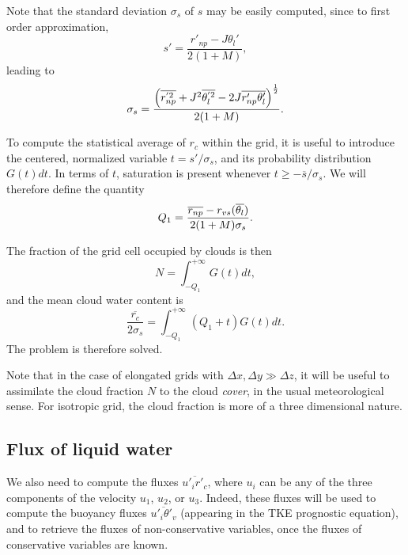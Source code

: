 Note that the standard deviation $\sigma_s$ of $s$ may be easily computed,
since to first order approximation,
\begin{equation}\label{eqn:s'}
s' = \dfrac {r'_{np} - J \theta_l'} {2(1+M)},
\end{equation}
leading to
\begin{equation}\label{eqn:sigma2}
\sigma_s = \dfrac {\left( \overline{r_{np}^{'2}} + J^2\overline{\theta_l^{'2}}-
2J\overline{r'_{np}\theta_l'} \right)^{1\over 2}} {2(1+M)}.
\end{equation}

To compute the statistical average of $r_c$ within the grid, it is useful
to introduce the centered, normalized variable $t= s'/\sigma_s$, and its
probability distribution $G(t)dt$. In terms of $t$, saturation is present
whenever $t \ge -\overline{s} /\sigma_s$. We will therefore define the
quantity
\begin{equation} \label{eqq1}
Q_1=  { \overline{r_{np}} - r_{vs}(\overline{\theta_l})
\over 2(1+M)\sigma_s }.
\end{equation}

The fraction of the grid cell occupied by clouds is then
\begin{equation}\label{eqn:N}
N = \int_{-Q_{1}}^{+\infty} G(t) dt,
\end{equation}
and the mean cloud water content is
\begin{equation}\label{eqn:rc}
\dfrac{\overline{r_c}}{2\sigma_s} = \int_{-Q_1}^{+\infty} (Q_1+t)G(t) dt.
\end{equation}
The problem is therefore solved.

Note that in the case of elongated grids with $\Delta x,\Delta y \gg \Delta z$,
it will be useful to assimilate the cloud fraction $N$ to the cloud {\em
cover}, in the usual meteorological sense. For isotropic grid, the cloud
fraction is more of a three dimensional nature.

\subsection{Flux of liquid water}

We also need to compute the  fluxes $\overline{{u'_{i}}{r'_{c}}}$, where
$u_{i}$ can be any of the three components of the velocity $u_{1}$, $u_{2}$, or
$u_{3}$.  Indeed, these fluxes will be used to compute the buoyancy fluxes
$\overline{{u'_{i}}{{\theta}'_{v}}}$ (appearing in the TKE prognostic
equation), and to retrieve the fluxes of non-conservative variables, once
the fluxes of conservative variables are known.

